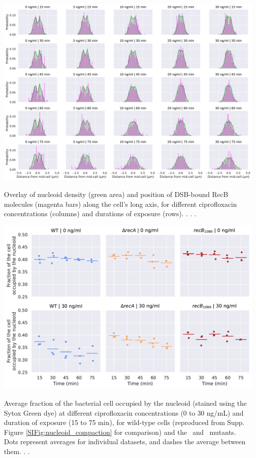 \begin{suppfigure*}[htbp]
    \begin{center}
    \includegraphics[width=\textwidth]{SI_Figures/RecB_Nucleoid_position_timepoints.pdf}
    \end{center}
    \caption{Overlay of nucleoid density (green area) and position of DSB-bound RecB molecules (magenta bars) along the cell's long axis, for different ciprofloxacin concentrations (columns) and durations of exposure (rows). . . .}
    \label{SIFig:recb_nucleoid_timepoints}
\end{suppfigure*}

\begin{suppfigure*}[htbp]
    \begin{center}
    \includegraphics[width=.8\textwidth]{SI_Figures/Mutants_nucleoid_compaction.pdf}
    \end{center}
    \caption{Average fraction of the bacterial cell occupied by the nucleoid (stained using the Sytox Green dye) at different ciprofloxacin concentrations (0 to 30 ng/mL) and duration of exposure (15 to 75 min), for wild-type cells (reproduced from Supp. Figure \ref{SIFig:nucleoid_compaction} for comparison) and the \dreca\ and \geneteneighty\ mutants. Dots represent averages for individual datasets, and dashes the average between them. . .}
    \label{SIFig:mutants_nucleoid_compaction}
\end{suppfigure*}

